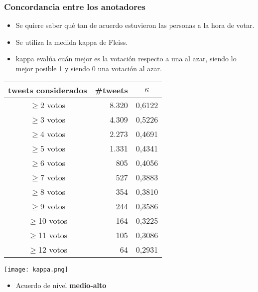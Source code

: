 \begin{frame}[allowframebreaks]
    \frametitle{Concordancia entre los anotadores}

    \begin{itemize}
        \item Se quiere saber qué tan de acuerdo estuvieron las personas a la hora de votar.
        \item Se utiliza la medida kappa de Fleiss.
        \item kappa evalúa cuán mejor es la votación respecto a una al azar, siendo lo mejor posible 1 y siendo 0 una votación al azar.
    \end{itemize}

    \framebreak

    \begin{center}
        \begin{tabular}{ c | r | c }
            tweets considerados & \#tweets & $\kappa$ \\
            \hline
            $\geq$2 votos & 8.320 & 0,6122 \\
            $\geq$3 votos & 4.309 & 0,5226 \\
            $\geq$4 votos & 2.273 & 0,4691 \\
            $\geq$5 votos & 1.331 & 0,4341 \\
            $\geq$6 votos & 805 & 0,4056 \\
            $\geq$7 votos & 527 & 0,3883 \\
            $\geq$8 votos & 354 & 0,3810 \\
            $\geq$9 votos & 244 & 0,3586 \\
            $\geq$10 votos & 164 & 0,3225 \\
            $\geq$11 votos & 105 & 0,3086 \\
            $\geq$12 votos & 64 & 0,2931 \\
        \end{tabular}

        \texttt{[image: kappa.png]}
    \end{center}

    \framebreak

    \begin{itemize}
        \item \large{Acuerdo de nivel \textbf{medio-alto}}
    \end{itemize}
\end{frame}
